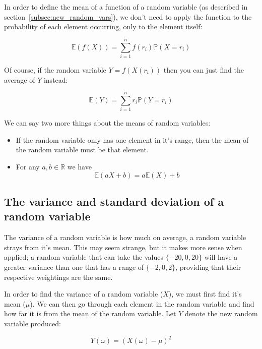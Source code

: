 In order to define the mean of a function of a random variable (as described in
section~\ref{subsec:new_random_vars}), we don't need to apply the function to
the probability of each element occurring, only to the element itself:

\begin{dmath}
	\mathbb{E}(f(X)) = {\sum\limits_{i=1}^{n} f(r_i) \mathbb{P}(X = r_i)}
\end{dmath}

Of course, if the random variable $Y = f(X(r_i))$ then you can just find
the average of $Y$ instead:

\begin{dmath}
	\mathbb{E}(Y) = {\sum\limits_{i=1}^{n} r_i \mathbb{P}(Y = r_i)}
\end{dmath}

We can say two more things about the means of random variables:

\begin{itemize}
	\item If the random variable only has one element in it's range, then the mean of the random variable must be that element.
	\item For any $a, b \in \mathbb{R}$ we have
	\begin{dmath}
		\mathbb{E}(aX + b) = a\mathbb{E}(X) + b
	\end{dmath}
\end{itemize}

\subsection{The variance and standard deviation of a random variable}

The variance of a random variable is how much on average, a random variable
strays from it's mean. This may seem strange, but it makes more sense when
applied; a random variable that can take the values $\{-20, 0, 20\}$ will have
a greater variance than one that has a range of $\{-2, 0, 2\}$, providing that
their respective weightings are the same.

In order to find the variance of a random variable ($X$), we must first find
it's mean ($\mu$). We can then go through each element in the random variable
and find how far it is from the mean of the random variable. Let $Y$ denote
the new random variable produced:

\begin{dmath}
	Y(\omega) = (X(\omega) - \mu)^2
\end{dmath}

